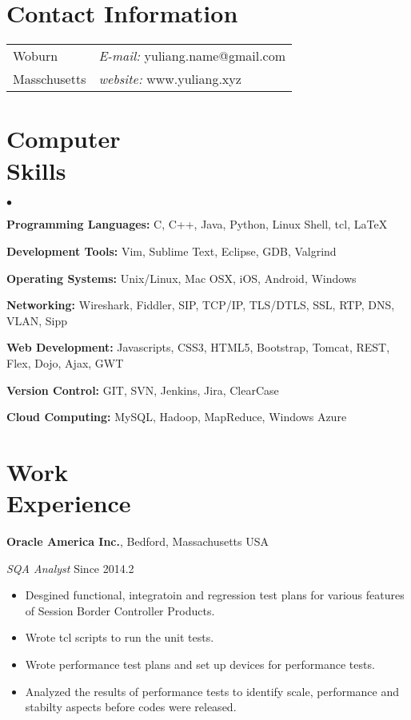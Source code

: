 \documentclass[margin,line]{res}
\newenvironment{list2}{
  \begin{list}{$\bullet$}{%
      \setlength{\itemsep}{0in}
      \setlength{\parsep}{0.05in} \setlength{\parskip}{0in}
      \setlength{\topsep}{0in} \setlength{\partopsep}{0in}
      \setlength{\leftmargin}{0.2in}}}{\end{list}}
\begin{document}
\vspace{-2cm}

\begin{resume}
\section{\sc Contact Information}
\vspace{.05in}
\begin{tabular}{@{}p{2in}p{4in}}
Woburn & {\it E-mail:}  yuliang.name@gmail.com \\
Masschusetts  & {\it website:} www.yuliang.xyz \\     
\end{tabular}

\section{\sc Computer\\Skills}
\begin{list2}
\item {\bf Programming Languages:} C, C++, Java, Python, Linux Shell, tcl, \LaTeX
\item {\bf Development Tools:} Vim, Sublime Text, Eclipse, GDB, Valgrind
\item {\bf Operating Systems:}  Unix/Linux, Mac OSX, iOS, Android, Windows
\item {\bf Networking:} Wireshark, Fiddler, SIP, TCP/IP, TLS/DTLS,
                  SSL, RTP, DNS, VLAN, Sipp
\item {\bf Web Development:} Javascripts, CSS3, HTML5, Bootstrap, Tomcat,
                       REST, Flex, Dojo, Ajax, GWT
\item {\bf Version Control:} GIT, SVN, Jenkins, Jira, ClearCase
\item {\bf Cloud Computing:} MySQL, Hadoop, MapReduce, Windows Azure\\
\end{list2}

\section{\sc Work\\Experience}
{\bf Oracle America Inc.}, Bedford, Massachusetts USA

\vspace{-.3cm}
{\em SQA Analyst} \hfill {Since 2014.2}\\
\begin{itemize}
\item Desgined functional, integratoin and regression test plans for various features
of Session Border Controller Products.
\item Wrote tcl scripts to run the unit tests.
\item Wrote performance test plans and set up devices for performance tests.
\item Analyzed the results of performance tests to identify scale, performance and
stabilty aspects before codes were released.
\end{itemize}


\end{resume}
\end{document}
